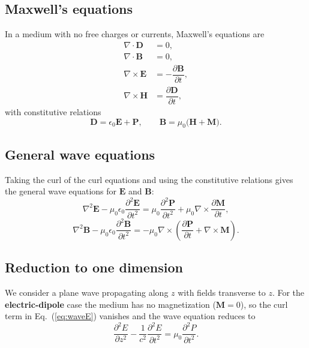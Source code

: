 \documentclass[12pt,a4paper]{article}
\newcommand{\pderiv}[2]{\dfrac{\partial #1}{\partial #2}}
\begin{document}
\subsection{Maxwell's equations}

In a medium with no free charges or currents, Maxwell's equations are
\begin{align}
  \nabla \cdot \mathbf{D} &= 0, \\
  \nabla \cdot \mathbf{B} &= 0, \\
  \nabla \times \mathbf{E} &= -\pderiv{\mathbf{B}}{t}, \\
  \nabla \times \mathbf{H} &= \pderiv{\mathbf{D}}{t},
\end{align}
with constitutive relations
\begin{equation}
  \mathbf{D} = \epsilon_0\mathbf{E} + \mathbf{P},
  \qquad
  \mathbf{B} = \mu_0\bigl(\mathbf{H} + \mathbf{M}\bigr).
\end{equation}

\subsection{General wave equations}

Taking the curl of the curl equations and using the constitutive relations
gives the general wave equations for $\mathbf{E}$ and $\mathbf{B}$:
\begin{equation}
  \nabla^2\mathbf{E} - \mu_0\epsilon_0\pderiv{^2\mathbf{E}}{t^2}
  = \mu_0\pderiv{^2\mathbf{P}}{t^2}
  + \mu_0\nabla\times\pderiv{\mathbf{M}}{t},
  \label{eq:waveE}
\end{equation}
\begin{equation}
  \nabla^2\mathbf{B} - \mu_0\epsilon_0\pderiv{^2\mathbf{B}}{t^2}
  = -\mu_0\nabla\times\!\left(\pderiv{\mathbf{P}}{t}
  + \nabla\times\mathbf{M}\right).
  \label{eq:waveB}
\end{equation}

\subsection{Reduction to one dimension}

We consider a plane wave propagating along $z$ with fields transverse to $z$.
For the \textbf{electric-dipole} case the medium has no magnetization
($\mathbf{M}=0$), so the curl term in Eq.~(\ref{eq:waveE}) vanishes and
the wave equation reduces to
\begin{equation}
  \pderiv{^2 E}{z^2} - \frac{1}{c^2}\pderiv{^2 E}{t^2}
  = \mu_0\pderiv{^2 P}{t^2}.
  \label{eq:wave1DE}
\end{equation}
\end{document}
